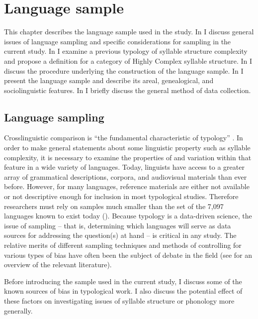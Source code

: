 \chapter{Language sample}\label{sec:2}

  This chapter describes the language sample used in the study. In  I discuss general issues of language sampling and specific considerations for sampling in the current study. In  I examine a previous typology of syllable structure complexity and propose a definition for a category of Highly Complex syllable structure. In  I discuss the procedure underlying the construction of the language sample. In  I present the language sample and describe its areal, genealogical, and sociolinguistic features. In  I briefly discuss the general method of data collection.

\section{Language sampling}\label{sec:2.1}

  Crosslinguistic comparison is “the fundamental characteristic of typology” \citep[6]{Croft2003}. In order to make general statements about some linguistic property such as syllable complexity, it is necessary to examine the properties of and variation within that feature in a wide variety of languages. Today, linguists have access to a greater array of grammatical descriptions, corpora, and audiovisual materials than ever before. However, for many languages, reference materials are either not available or not descriptive enough for inclusion in most typological studies. Therefore researchers must rely on samples much smaller than the set of the 7,097 languages known to exist today (\citealt{SimonsFennig2018}). Because typology is a data-driven science, the issue of sampling -- that is, determining which languages will serve as data sources for addressing the question(s) at hand -- is critical in any study. The relative merits of different sampling techniques and methods of controlling for various types of bias have often been the subject of debate in the field (see \citealt{Bakker2011} for an overview of the relevant literature). 

  Before introducing the sample used in the current study, I discuss some of the known sources of bias in typological work. I also discuss the potential effect of these factors on investigating issues of syllable structure or phonology more generally.

